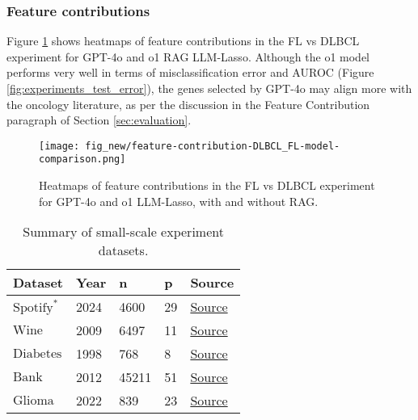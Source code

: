 \subsubsection{Feature contributions}\label{subsec:feat_cont}
Figure \ref{fig:feature_contribution} shows heatmaps of feature contributions in the FL vs DLBCL experiment for GPT-4o and o1 RAG LLM-Lasso.
Although the o1 model performs very well in terms of misclassification error and AUROC (Figure \ref{fig:experiments_test_error}), the genes selected by GPT-4o may align more with the oncology literature, as per the discussion in the Feature Contribution paragraph of Section \ref{sec:evaluation}.

\begin{figure}[h!]
    \centering
    \texttt{[image: fig\_new/feature-contribution-DLBCL\_FL-model-comparison.png]}
    \caption{Heatmaps of feature contributions in the FL vs DLBCL experiment for GPT-4o and o1 LLM-Lasso, with and without RAG.}
    \label{fig:feature_contribution}
\end{figure}

\begin{table}[!ht]
\centering
\begin{tabular}{l l l l l}
\toprule
\textbf{Dataset} & \textbf{Year} & \textbf{n} & \textbf{p} & \textbf{Source} \\
\midrule
$\text{Spotify}^*$ & 2024 & 4600 & 29 & \href{https://www.kaggle.com/datasets/nelgiriyewithana/most-streamed-spotify-songs-2024/data}{Source} \\
$\text{Wine}$ & 2009 & 6497 & 11 & \href{https://www.kaggle.com/datasets/yasserh/wine-quality-dataset}{Source} \\
$\text{Diabetes}$ & 1998 & 768 & 8 & \href{https://www.kaggle.com/datasets/uciml/pima-indians-diabetes-database}{Source} \\
$\text{Bank}$ & 2012 & 45211 & 51 & \href{https://archive.ics.uci.edu/dataset/222/bank+marketing}{Source} \\
$\text{Glioma}$ & 2022 & 839 & 23 & \href{https://archive.ics.uci.edu/dataset/759/glioma+grading+clinical+and+mutation+features+dataset}{Source}\\
\midrule
\end{tabular}
\caption{Summary of small-scale experiment datasets.}
\label{tab:small_data}
\end{table}

